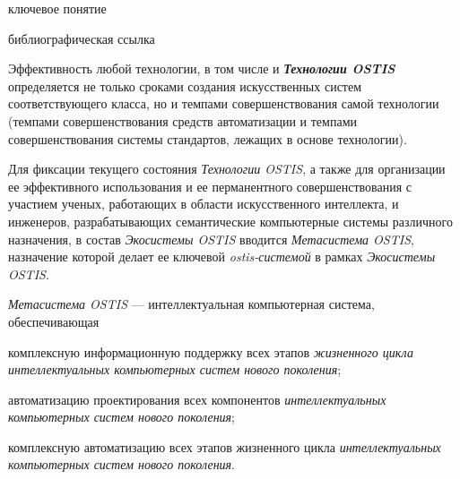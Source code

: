 \begin{scnrelfromlist}{ключевое понятие}
\end{scnrelfromlist}

	\begin{scnrelfromlist}{библиографическая ссылка}
\end{scnrelfromlist}

Эффективность любой технологии, в том числе и \textbf{\textit{Технологии OSTIS}} определяется не только сроками создания искусственных систем соответствующего класса, но и темпами совершенствования самой технологии (темпами совершенствования средств автоматизации и темпами совершенствования системы стандартов, лежащих в основе технологии).

Для фиксации текущего состояния \textit{Технологии OSTIS}, а также для организации ее эффективного использования и ее перманентного совершенствования с участием ученых, работающих в области искусственного интеллекта, и инженеров, разрабатывающих семантические компьютерные системы различного назначения, в состав \textit{Экосистемы OSTIS} вводится \textit{Метасистема OSTIS}, назначение которой делает ее ключевой \textit{ostis-системой} в рамках \textit{Экосистемы OSTIS}.

\begin{SCn}
	\begin{scnindent}
	\end{scnindent}
\end{SCn}	

\textit{Метасистема OSTIS} --- интеллектуальная компьютерная система, обеспечивающая 
\begin{textitemize}
	\item комплексную информационную поддержку всех этапов \textit{жизненного цикла} \textit{интеллектуальных компьютерных систем нового поколения};
	\item автоматизацию проектирования всех компонентов \textit{интеллектуальных компьютерных систем нового поколения};
	\item комплексную автоматизацию всех этапов жизненного цикла \textit{интеллектуальных компьютерных систем нового поколения}.
\end{textitemize}

